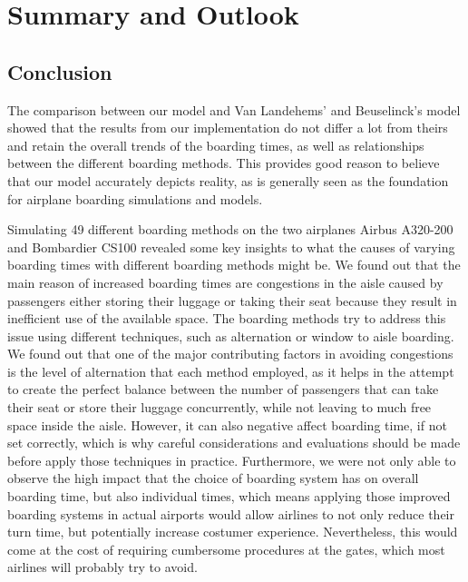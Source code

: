 \documentclass[11pt]{article}
\begin{document}
	

\section{Summary and Outlook}

\subsection{Conclusion}
The comparison between our model and Van Landehems' and Beuselinck's model \cite{beus} showed that the results from our implementation do not differ a lot from theirs and retain the overall trends of the boarding times, as well as relationships between the different boarding methods. This provides good reason to believe that our model accurately depicts reality, as \cite{beus} is generally seen as the foundation for airplane boarding simulations and models. 

Simulating 49 different boarding methods on the two airplanes Airbus A320-200 and Bombardier CS100 revealed some key insights to what the causes of varying boarding times with different boarding methods might be. We found out that the main reason of increased boarding times are congestions in the aisle caused by passengers either storing their luggage or taking their seat because they result in inefficient use of the available space. The boarding methods try to address this issue using different techniques, such as alternation or window to aisle boarding. We found out that one of the major contributing factors in avoiding congestions is the level of alternation that each method employed, as it helps in the attempt to create the perfect balance between the number of passengers that can take their seat or store their luggage concurrently, while not leaving to much free space inside the aisle. However, it can also negative affect boarding time, if not set correctly, which is why careful considerations and evaluations should be made before apply those techniques in practice. Furthermore, we were not only able to observe the high impact that the choice of boarding system has on overall boarding time, but also individual times, which means applying those improved boarding systems in actual airports would allow airlines to not only reduce their turn time, but potentially increase costumer experience. Nevertheless, this would come at the cost of requiring cumbersome procedures at the gates, which most airlines will probably try to avoid. 
\end{document}
